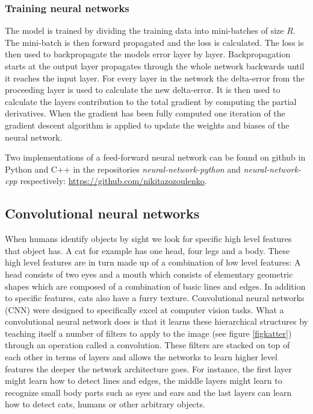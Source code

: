 \documentclass[a4paper,11pt,twoside]{article}
\begin{document}
\subsubsection{Training neural networks}
The model is trained by dividing the training data into mini-batches of size $R$. The mini-batch is then forward propagated and the loss is calculated. The loss is then used to backpropagate the models error layer by layer. Backpropagation starts at the output layer propagates through the whole network backwards until it reaches the input layer. For every layer in the network the delta-error from the proceeding layer is used to calculate the new delta-error. It is then used to calculate the layers contribution to the total gradient by computing the partial derivatives. When the gradient has been fully computed one iteration of the gradient descent algorithm is applied to update the weights and biases of the neural network. \cite{cs231n}

Two implementations of a feed-forward neural network can be found on github in Python and C++ in the repositories \textit{neural-network-python} and \textit{neural-network-cpp} respectively: \url{https://github.com/nikitazozoulenko}.

\subsection{Convolutional neural networks}
When humans identify objects by sight we look for specific high level features that object has. A cat for example has one head, four legs and a body. These high level features are in turn made up of a combination of low level features: A head consists of two eyes and a mouth which consists of elementary geometric shapes which are composed of a combination of basic lines and edges. In addition to specific features, cats also have a furry texture. Convolutional neural networks (CNN) were designed to specifically excel at computer vision tasks. What a convolutional neural network does is that it learns these hierarchical structures by teaching itself a number of filters to apply to the image (see figure \ref{figkatter}) through an operation called a convolution. These filters are stacked on top of each other in terms of layers and allows the networks to learn higher level features the deeper the network architecture goes. For instance, the first layer might learn how to detect lines and edges, the middle layers might learn to recognize small body parts such as eyes and ears and the last layers can learn how to detect cats, humans or other arbitrary objects. \cite{cs231n}
\end{document}
